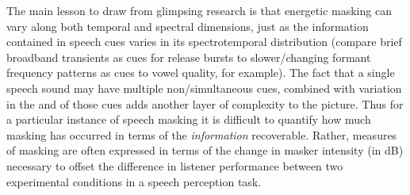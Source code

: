 
The main lesson to draw from glimpsing research is that energetic masking can vary along both temporal and spectral dimensions, just as the information contained in speech cues varies in its spectrotemporal distribution (compare brief broadband transients as cues for release bursts to slower\-/changing formant frequency patterns as cues to vowel quality, for example).  The fact that a single speech sound may have multiple non\-/simultaneous cues, combined with variation in the  and  of those cues adds another layer of complexity to the picture.\footnotemark{}  Thus for a particular instance of speech masking it is difficult to quantify how much masking has occurred in terms of the \emph{information} recoverable.  Rather, measures of masking are often expressed in terms of the change in masker intensity (in dB) necessary to offset the difference in listener performance between two experimental conditions in a speech perception task.
